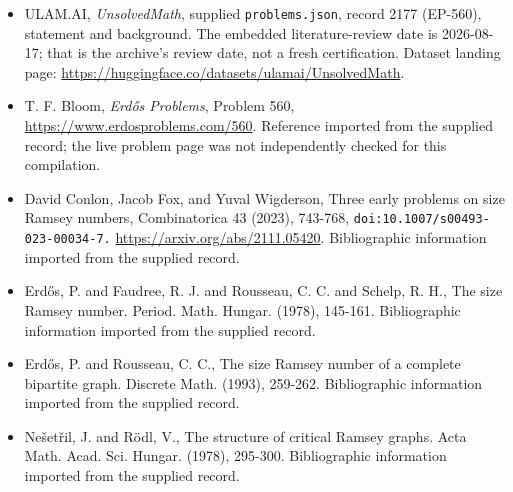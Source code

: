 \documentclass[11pt,a4paper]{article}
\begin{document}
{\small

\begin{itemize}

\item[\hypertarget{source:2177:1}{S1}] ULAM.AI, \emph{UnsolvedMath}, supplied \texttt{problems.json}, record 2177 (EP-560), statement and background. The embedded literature-review date is 2026-08-17; that is the archive’s review date, not a fresh certification. Dataset landing page: \url{https://huggingface.co/datasets/ulamai/UnsolvedMath}.

\item[\hypertarget{source:2177:2}{S2}] T. F. Bloom, \emph{Erdős Problems}, Problem 560, \url{https://www.erdosproblems.com/560}. Reference imported from the supplied record; the live problem page was not independently checked for this compilation.

\item[\hypertarget{source:2177:3}{S3}] David Conlon, Jacob Fox, and Yuval Wigderson, Three early problems on size Ramsey numbers, Combinatorica 43 (2023), 743-768, \nolinkurl{doi:10.1007/s00493-023-00034-7.} \url{https://arxiv.org/abs/2111.05420}. Bibliographic information imported from the supplied record.

\item[\hypertarget{source:2177:4}{S4}] Erd\H{o}s, P. and Faudree, R. J. and Rousseau, C. C. and Schelp, R. H., The size Ramsey number. Period. Math. Hungar. (1978), 145-161. Bibliographic information imported from the supplied record.

\item[\hypertarget{source:2177:5}{S5}] Erd\H{o}s, P. and Rousseau, C. C., The size Ramsey number of a complete bipartite graph. Discrete Math. (1993), 259-262. Bibliographic information imported from the supplied record.

\item[\hypertarget{source:2177:6}{S6}] Ne\v{s}et\v{r}il, J. and R\"{o}dl, V., The structure of critical Ramsey graphs. Acta Math. Acad. Sci. Hungar. (1978), 295-300. Bibliographic information imported from the supplied record.

\end{itemize}

}

\label{end:2177}
\end{document}
